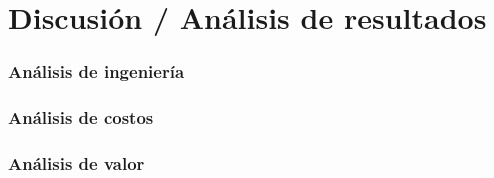 \chapter{Discusión / Análisis de resultados}

\subsection{Análisis de ingeniería}


\subsection{Análisis de costos}


\subsection{Análisis de valor}



\endinput